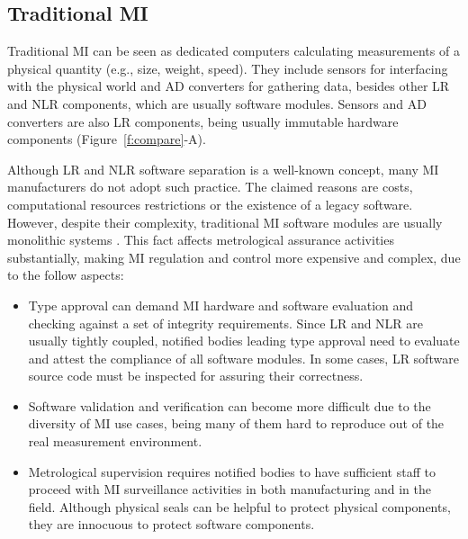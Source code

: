 \documentclass[journal]{IEEEtran}
\begin{document}
\subsection{Traditional MI}
\label{s:mi_traditional}
Traditional MI can be seen as dedicated computers calculating measurements of a physical quantity (e.g., size, weight, speed). They include sensors for interfacing with the physical world and AD converters for gathering data, besides other LR and NLR components, which are usually software modules. Sensors and AD converters are also LR components, being usually immutable hardware components (Figure~\ref{f:compare}-A).

Although LR and NLR software separation is a well-known concept, many MI manufacturers do not adopt such practice.
The claimed reasons are costs, computational resources restrictions or the existence of a legacy software. 
However, despite their complexity, traditional MI software modules are usually monolithic systems \cite{Abreu2017}. 
This fact affects metrological assurance activities substantially, making MI regulation and control more expensive and complex, due to the follow aspects:
\begin{itemize}
\item Type approval can demand MI hardware and software evaluation and checking against a set of integrity requirements. Since LR and NLR are usually tightly coupled, notified bodies leading type approval need to evaluate and attest the compliance of all software modules. In some cases, LR software source code must be inspected for assuring their correctness.
\item Software validation and verification can become more difficult due to the diversity of MI use cases, being many of them hard to reproduce out of the real measurement environment. 
\item Metrological supervision requires notified bodies to have sufficient staff to proceed with MI surveillance activities in both manufacturing and in the field. Although physical seals can be helpful to protect physical components, they are innocuous to protect software components.
\end{itemize}
\end{document}
